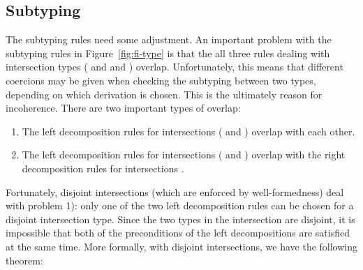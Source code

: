 

\subsection{Subtyping}


The subtyping rules need some adjustment. An important problem with the
subtyping rules in Figure~\ref{fig:fi-type} is that the all three rules dealing
with intersection types ( and
 and ) overlap.
Unfortunately, this means that different coercions may be given when checking
the subtyping between two types, depending on which derivation is chosen. This
is the ultimately reason for incoherence. There are two important types of
overlap:

\begin{enumerate}

\item The left decomposition rules for intersections (
and ) overlap with each other.

\item The left decomposition rules for intersections (
and ) overlap with the right decomposition rules for
intersections .

\end{enumerate}

\noindent Fortunately, disjoint intersections (which are enforced by
well-formedness) deal with problem 1): only one of the two left decomposition
rules can be chosen for a disjoint intersection type. Since the two types in the
intersection are disjoint, it is impossible that both of the preconditions of
the left decompositions are satisfied at the same time. More formally, with
disjoint intersections, we have the following theorem:

